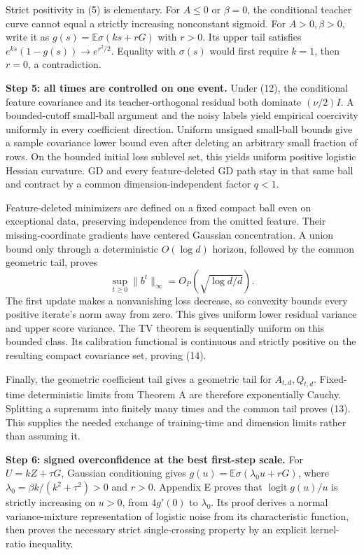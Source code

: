 \documentclass[
  11pt,
  a4paper,
]{article}
\begin{document}
Strict positivity in (5) is elementary. For \(A\le0\) or \(\beta=0\),
the conditional teacher curve cannot equal a strictly increasing
nonconstant sigmoid. For \(A>0,\beta>0\), write it as
\(g(s)=\mathbb E\sigma(ks+rG)\) with \(r>0\). Its upper tail satisfies
\(e^{ks}(1-g(s))\to e^{r^2/2}\). Equality with \(\sigma(s)\) would first
require \(k=1\), then \(r=0\), a contradiction.

\textbf{Step 5: all times are controlled on one event.} Under (12), the
conditional feature covariance and its teacher-orthogonal residual both
dominate \((\nu/2)I\). A bounded-cutoff small-ball argument and the
noisy labels yield empirical coercivity uniformly in every coefficient
direction. Uniform unsigned small-ball bounds give a sample covariance
lower bound even after deleting an arbitrary small fraction of rows. On
the bounded initial loss sublevel set, this yields uniform positive
logistic Hessian curvature. GD and every feature-deleted GD path stay in
that same ball and contract by a common dimension-independent factor
\(q<1\).

Feature-deleted minimizers are defined on a fixed compact ball even on
exceptional data, preserving independence from the omitted feature.
Their missing-coordinate gradients have centered Gaussian concentration.
A union bound only through a deterministic \(O(\log d)\) horizon,
followed by the common geometric tail, proves \[
\sup_{t\ge0}\|b^t\|_\infty=O_P(\sqrt{\log d/d}).
\] The first update makes a nonvanishing loss decrease, so convexity
bounds every positive iterate's norm away from zero. This gives uniform
lower residual variance and upper score variance. The TV theorem is
sequentially uniform on this bounded class. Its calibration functional
is continuous and strictly positive on the resulting compact covariance
set, proving (14).

Finally, the geometric coefficient tail gives a geometric tail for
\(A_{t,d},Q_{t,d}\). Fixed-time deterministic limits from Theorem A are
therefore exponentially Cauchy. Splitting a supremum into finitely many
times and the common tail proves (13). This supplies the needed exchange
of training-time and dimension limits rather than assuming it.

\textbf{Step 6: signed overconfidence at the best first-step scale.} For
\(U=kZ+\tau G\), Gaussian conditioning gives
\(g(u)=\mathbb E\sigma(\lambda_0u+rG)\), where
\(\lambda_0=\beta k/(k^2+\tau^2)>0\) and \(r>0\). Appendix E proves that
\(\operatorname{logit}g(u)/u\) is strictly increasing on \(u>0\), from
\(4g'(0)\) to \(\lambda_0\). Its proof derives a normal variance-mixture
representation of logistic noise from its characteristic function, then
proves the necessary strict single-crossing property by an explicit
kernel-ratio inequality.
\end{document}
